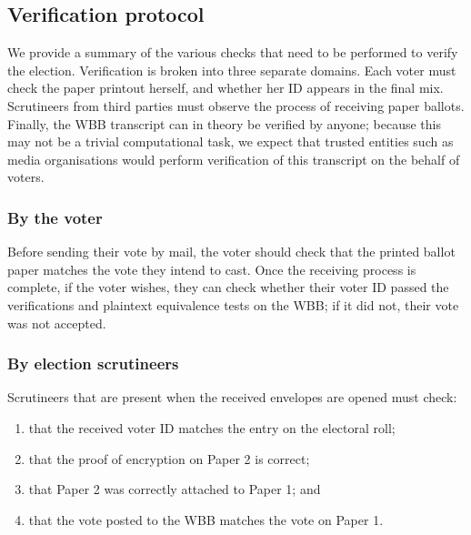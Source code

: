 \documentclass[11pt,twoside,a4paper]{article}
\theoremstyle{definition}
\begin{document}
\subsection{Verification protocol}
We provide a summary of the various checks that need to be performed to verify the election. Verification is broken into three separate domains. Each voter must check the paper printout herself, and whether her ID appears in the final mix. Scrutineers from third parties must observe the process of receiving paper ballots. Finally, the WBB transcript can in theory be verified by anyone; because this may not be a trivial computational task, we expect that trusted entities such as media organisations would perform verification of this transcript on the behalf of voters.

\subsubsection{By the voter}
Before sending their vote by mail, the voter should check that the printed ballot paper matches the vote they intend to cast. Once the receiving process is complete, if the voter wishes, they can check whether their voter ID passed the verifications and plaintext equivalence tests on the WBB; if it did not, their vote was not accepted.

\subsubsection{By election scrutineers}
Scrutineers that are present when the received envelopes are opened must check:
\begin{enumerate}
	\item that the received voter ID matches the entry on the electoral roll;
	\item that the proof of encryption on Paper 2 is correct;
	\item that Paper 2 was correctly attached to Paper 1; and
	\item that the vote posted to the WBB matches the vote on Paper 1.
\end{enumerate}
\end{document}
